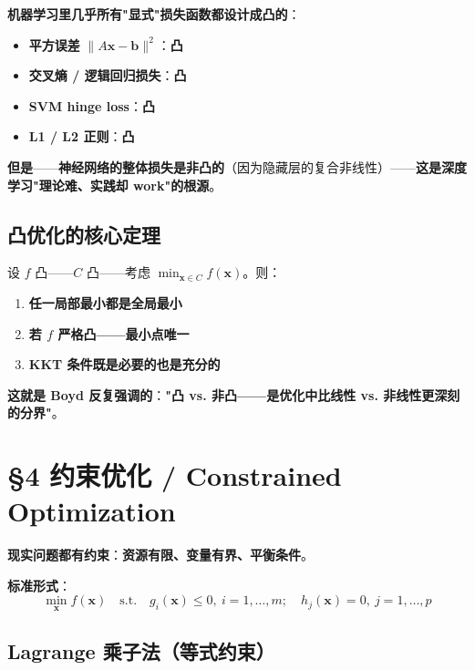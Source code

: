 \textbf{机器学习里几乎所有"显式"损失函数都设计成凸的}：

\begin{itemize}
\item \textbf{平方误差} $\|A\bm x - \bm b\|^2$：\textbf{凸}
\item \textbf{交叉熵 / 逻辑回归损失}：\textbf{凸}
\item \textbf{SVM hinge loss}：\textbf{凸}
\item \textbf{L1 / L2 正则}：\textbf{凸}
\end{itemize}

\textbf{但是}——\textbf{神经网络的整体损失是\textbf{非凸}的}（因为隐藏层的复合非线性）——\textbf{这是深度学习"理论难、实践却 work"的根源}。

\subsection{凸优化的核心定理}

\begin{theorem}[凸优化的全局最优性]
设 $f$ 凸——$C$ 凸——考虑 $\min_{\bm x \in C} f(\bm x)$。则：
\begin{enumerate}
\item \textbf{任一局部最小都是全局最小}
\item \textbf{若 $f$ 严格凸——最小点唯一}
\item \textbf{KKT 条件\textbf{既是必要的也是充分的}}
\end{enumerate}
\end{theorem}

\textbf{这就是 Boyd 反复强调的}：\textbf{"\textbf{凸 vs. 非凸——是优化中比线性 vs. 非线性更深刻的分界}"}。

\section{§4 约束优化 / Constrained Optimization}

\textbf{现实问题都有约束}：\textbf{资源有限、变量有界、平衡条件}。

\textbf{标准形式}：
\begin{equation}
\min_{\bm x} f(\bm x) \quad \text{s.t.} \quad g_i(\bm x) \le 0, \ i=1,\dots,m; \quad h_j(\bm x) = 0, \ j=1,\dots,p
\end{equation}

\subsection{Lagrange 乘子法（等式约束）}

